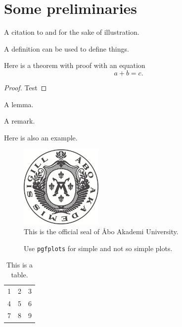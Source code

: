 \chapter{Some preliminaries}

A citation to \cite{lundell2009transformation} and \cite{lundell2009some} for the sake of illustration.

\begin{definition}
    A definition can be used to define things.
\end{definition}

\begin{theorem}
    Here is a theorem with proof with an equation
        \begin{equation}
            a+b=c.
        \end{equation}
\end{theorem}

\begin{proof}
Test
\end{proof}

\begin{lemma}
    A lemma.
\end{lemma}

\begin{remark}
    A remark.
\end{remark}

\begin{example}
    Here is also an example.
\end{example}

\blindmathfalse
\Blindtext

\begin{figure}[t]
    \centering
    \includegraphics[width=4cm]{sigill.png}
    \caption{This is the official seal of {\AA}bo Akademi University.}
    \label{fig:my_figure}
\end{figure}

\Blindtext

\begin{figure}[tb]
    \centering
    \caption{Use \texttt{pgfplots} for simple and not so simple plots.}
    \label{fig:my_plot}
\end{figure}

\Blindtext


\begin{table}[t]
    \centering
    \begin{tabular}{ l c r }
      1 & 2 & 3 \\
      4 & 5 & 6 \\
      7 & 8 & 9 \\
    \end{tabular}
    \caption{This is a table.}
    \label{fig:my_table}
\end{table}

